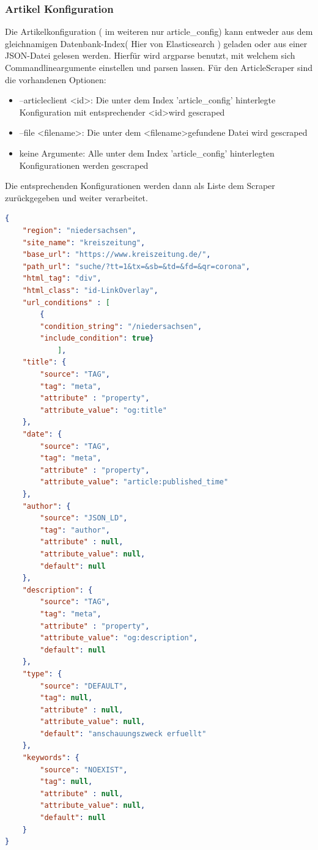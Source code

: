 \documentclass[12pt,oneside,a4paper,parskip]{scrbook}
\begin{document}
\subsubsection{Artikel Konfiguration}
Die Artikelkonfiguration ( im weiteren nur article\_config) kann entweder aus dem gleichnamigen Datenbank-Index( Hier von  Elasticsearch ) geladen oder aus einer JSON-Datei gelesen werden. Hierfür wird argparse benutzt, mit welchem sich Commandlineargumente einstellen und parsen lassen. Für den ArticleScraper sind die vorhandenen Optionen:
\begin{itemize}
\item --articleclient \textless id\textgreater: Die unter dem Index 'article\_config' hinterlegte Konfiguration mit entsprechender \textless id\textgreater wird gescraped
\item --file \textless filename\textgreater: Die unter dem \textless filename\textgreater gefundene Datei wird gescraped
\item keine Argumente: Alle unter dem Index 'article\_config' hinterlegten Konfigurationen werden gescraped
\end{itemize}
Die entsprechenden Konfigurationen werden dann als Liste dem Scraper zurückgegeben und weiter verarbeitet.
\begin{lstlisting}[caption=article\_config am Beispiel Niedersachsen,label=articleconfig,language=json]
{
    "region": "niedersachsen",
    "site_name": "kreiszeitung",
    "base_url": "https://www.kreiszeitung.de/",
    "path_url": "suche/?tt=1&tx=&sb=&td=&fd=&qr=corona",
    "html_tag": "div",
    "html_class": "id-LinkOverlay",
    "url_conditions" : [
        {
        "condition_string": "/niedersachsen",
        "include_condition": true}
        	],
    "title": {
        "source": "TAG",
        "tag": "meta",
        "attribute" : "property",
        "attribute_value": "og:title"
    },
    "date": {
        "source": "TAG",
        "tag": "meta",
        "attribute" : "property",
        "attribute_value": "article:published_time"
    },
    "author": {
        "source": "JSON_LD",
        "tag": "author",
        "attribute" : null,
        "attribute_value": null,
        "default": null
    },
    "description": {
        "source": "TAG",
        "tag": "meta",
        "attribute" : "property",
        "attribute_value": "og:description",
        "default": null
    },
    "type": {
        "source": "DEFAULT",
        "tag": null,
        "attribute" : null,
        "attribute_value": null,
        "default": "anschauungszweck erfuellt"
    },
    "keywords": {
        "source": "NOEXIST",
        "tag": null,
        "attribute" : null,
        "attribute_value": null,
        "default": null
    }
}
\end{lstlisting}
\pagebreak
\end{document}
